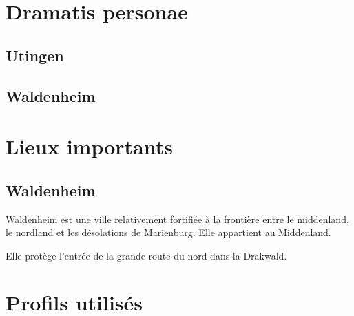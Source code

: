 \documentclass[10pt,a4paper]{book}
\begin{document}
\chapter{Dramatis personae}
\section{Utingen}
\section{Waldenheim}

\chapter{Lieux importants}
\section{Waldenheim}
Waldenheim est une ville relativement fortifiée à la frontière entre le middenland, le nordland et les désolations de Marienburg. Elle appartient au Middenland.

Elle protège l'entrée de la grande route du nord dans la Drakwald.
\chapter{Profils utilisés}
\end{document}
